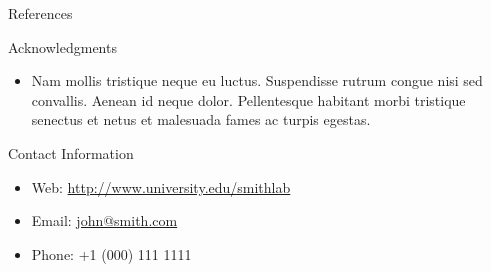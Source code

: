\documentclass[final,hyperref={pdfpagelabels=false}]{beamer}
\begin{document}
\begin{frame}[t]
\begin{columns}[t]
\begin{column}{.465\textwidth}
\begin{block}{References}
        
\nocite{*} %
\small{
}

\end{block}


\begin{block}{Acknowledgments}

\begin{itemize}
\item Nam mollis tristique neque eu luctus. Suspendisse rutrum congue nisi sed convallis. Aenean id neque dolor. Pellentesque habitant morbi tristique senectus et netus et malesuada fames ac turpis egestas.
\end{itemize}

\end{block}



\begin{block}{Contact Information}

\begin{itemize}
\item Web: \href{http://www.university.edu/smithlab}{http://www.university.edu/smithlab}
\item Email: \href{mailto:john@smith.com}{john@smith.com}
\item Phone: +1 (000) 111 1111
\end{itemize}

\end{block}


\end{column} %

\begin{column}{.015\textwidth}\end{column} %

\end{columns} %

\end{frame} %
\end{document}
